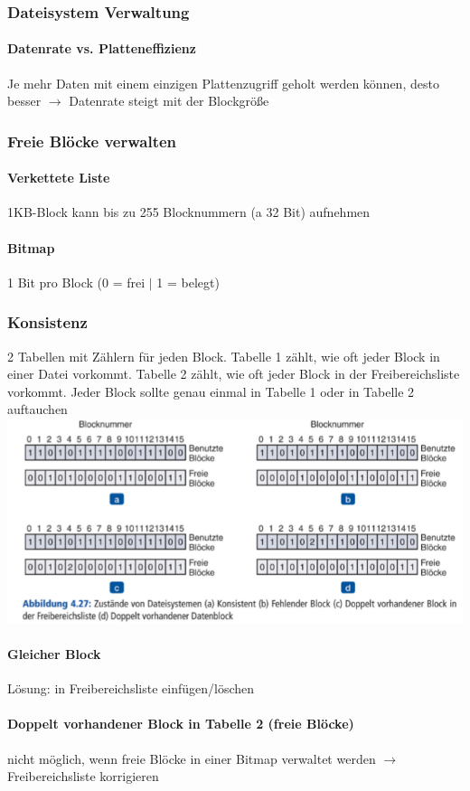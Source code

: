 \documentclass[10pt,a4paper,landscape]{article}
\begin{document}
\begin{multicols*}{3}
	\subsubsection{Dateisystem Verwaltung}
	\paragraph{Datenrate vs. Platteneffizienz} Je mehr Daten mit einem einzigen Plattenzugriff geholt werden können, desto besser $\rightarrow$ Datenrate steigt mit der Blockgröße
	\subsubsection{Freie Blöcke verwalten}
	\paragraph{Verkettete Liste} 1KB-Block kann bis zu 255 Blocknummern (a 32 Bit) aufnehmen
	\paragraph{Bitmap} 1 Bit pro Block (0 = frei $\vert$ 1 = belegt)
	\subsubsection{Konsistenz}
	2 Tabellen mit Zählern für jeden Block. Tabelle 1 zählt, wie oft jeder Block in einer Datei vorkommt. Tabelle 2 zählt, wie oft jeder Block in der Freibereichsliste vorkommt. Jeder Block sollte genau einmal in Tabelle 1 oder in Tabelle 2 auftauchen\\
	\includegraphics[width=0.95\columnwidth]{konsistenz}
	\paragraph{Gleicher Block} Lösung: in Freibereichsliste einfügen/löschen
	\paragraph{Doppelt vorhandener Block in Tabelle 2 (freie Blöcke)} nicht möglich, wenn freie Blöcke in einer Bitmap verwaltet werden $\rightarrow$ Freibereichsliste korrigieren

\end{multicols*}
\end{document}
